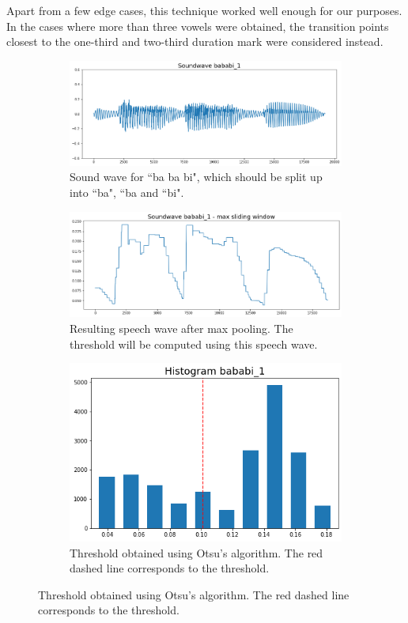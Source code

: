 \begin{appendices}
	Apart from a few edge cases, this technique worked well enough for our purposes. In the cases where more than three vowels were obtained, the transition points closest to the one-third and two-third duration mark were considered instead.

		
		\begin{figure}
			\centering	
			\begin{minipage}{\linewidth}
				\centering
				
				\begin{subfigure}{\linewidth}
					\centering
					\includegraphics[width=0.5\linewidth]{screenshot017}
					\caption{Sound wave for ``ba ba bi", which should be split up into ``ba", ``ba and ``bi".}
					\label{fig:full sound wave adjusted yaxis}
				\end{subfigure}
				
				\vspace{1em}
				
				
				\begin{subfigure}{\linewidth}
					\centering
					\includegraphics[width=0.5\linewidth]{screenshot012}
					\caption{Resulting speech wave after max pooling. The threshold will be computed using this speech wave.}
					\label{fig:max sliding window}
				\end{subfigure}
				
				\vspace{1em}
				
				\begin{subfigure}{\linewidth}
					\centering
					\includegraphics[width=0.3\linewidth]{screenshot018}
					\caption{Threshold obtained using Otsu's algorithm. The red dashed line corresponds to the threshold.}
					\label{fig:histogram}
				\end{subfigure}
				

\end{minipage}
\end{figure}
\end{appendices}
